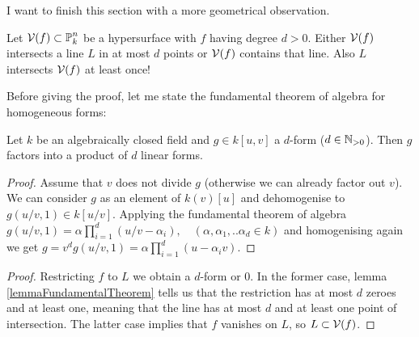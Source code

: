 I want to finish this section with a more geometrical observation.
\begin{proposition} \label{propositionDegreeOfSurface}
Let $\operatorname{\mathcal V}(f) \subset \operatorname{\mathbb P}^n_k$ be a hypersurface with $f$ having degree $d> 0$.
Either $\operatorname{\mathcal V}(f)$ intersects a line $L$ in at most $d$ points or $\operatorname{\mathcal V}(f)$ contains that line.
Also $L$ intersects $\operatorname{\mathcal V}(f)$ at least once!
\end{proposition}

Before giving the proof, let me state the fundamental theorem of algebra for homogeneous forms:

\begin{lemma} \label{lemmaFundamentalTheorem}
Let $k$ be an algebraically closed field and $g \in k[u,v]$ a $d$-form ($d \in \operatorname{\mathbb N_{>0}}$).
Then $g$ factors into a product of $d$ linear forms.
\end{lemma}
\begin{proof}
Assume that $v$ does not divide $g$ (otherwise we can already factor out $v$).
We can consider $g$ as an element of $k(v)[u]$ and dehomogenise to $g(u/v,1) \in k[u/v]$.
Applying the fundamental theorem of algebra $g(u/v,1) = \alpha\prod_{i=1}^d(u/v - \alpha_i), \quad (\alpha,\alpha_1,..\alpha_d \in k)$ and homogenising again we get
$g = v^d g(u/v,1) = \alpha\prod_{i=1}^d(u - \alpha_iv)$.
\end{proof}

\begin{proof}
Restricting $f$ to $L$ we obtain a $d$-form or 0.
In the former case, lemma \ref{lemmaFundamentalTheorem} tells us that the restriction has at most $d$ zeroes and at least one, meaning that the line has at most $d$ and at least one point of intersection.
The latter case implies that $f$ vanishes on $L$, so $L \subset \operatorname{\mathcal V}(f)$.
\end{proof}
